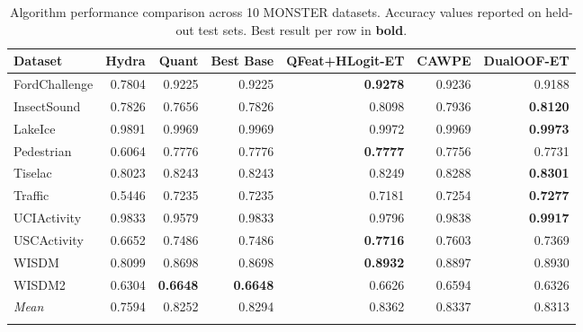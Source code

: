 \begin{table}[t]
\caption{Algorithm performance comparison across 10 MONSTER datasets. Accuracy values reported on held-out test sets. Best result per row in \textbf{bold}.}\label{tab:algorithm_comparison}
\centering
\begin{tabular}{lrrrrrr}
\toprule
Dataset & Hydra & Quant & Best Base & QFeat+HLogit-ET & CAWPE & DualOOF-ET \\
\midrule
FordChallenge & 0.7804 & 0.9225 & 0.9225 & \textbf{0.9278} & 0.9236 & 0.9188 \\
InsectSound & 0.7826 & 0.7656 & 0.7826 & 0.8098 & 0.7936 & \textbf{0.8120} \\
LakeIce & 0.9891 & 0.9969 & 0.9969 & 0.9972 & 0.9969 & \textbf{0.9973} \\
Pedestrian & 0.6064 & 0.7776 & 0.7776 & \textbf{0.7777} & 0.7756 & 0.7731 \\
Tiselac & 0.8023 & 0.8243 & 0.8243 & 0.8249 & 0.8288 & \textbf{0.8301} \\
Traffic & 0.5446 & 0.7235 & 0.7235 & 0.7181 & 0.7254 & \textbf{0.7277} \\
UCIActivity & 0.9833 & 0.9579 & 0.9833 & 0.9796 & 0.9838 & \textbf{0.9917} \\
USCActivity & 0.6652 & 0.7486 & 0.7486 & \textbf{0.7716} & 0.7603 & 0.7369 \\
WISDM & 0.8099 & 0.8698 & 0.8698 & \textbf{0.8932} & 0.8897 & 0.8930 \\
WISDM2 & 0.6304 & \textbf{0.6648} & \textbf{0.6648} & 0.6626 & 0.6594 & 0.6326 \\
\midrule
\textit{Mean} & 0.7594 & 0.8252 & 0.8294 & 0.8362 & 0.8337 & 0.8313 \\
\botrule
\end{tabular}
\end{table}